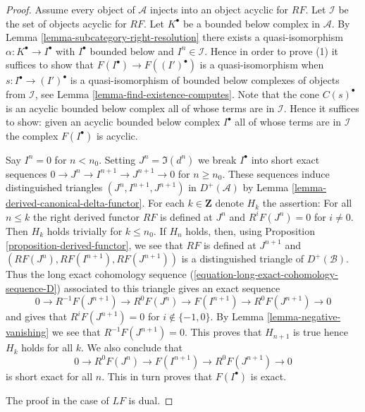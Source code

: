 \begin{proof}
Assume every object of $\mathcal{A}$ injects into an object acyclic
for $RF$. Let $\mathcal{I}$ be the set of objects acyclic for $RF$.
Let $K^\bullet$ be a bounded below complex in $\mathcal{A}$. By
Lemma \ref{lemma-subcategory-right-resolution}
there exists a quasi-isomorphism $\alpha : K^\bullet \to I^\bullet$ with
$I^\bullet$ bounded below and $I^n \in \mathcal{I}$. Hence in order to
prove (1) it suffices to show that
$F(I^\bullet) \to F((I')^\bullet)$ is a quasi-isomorphism when
$s : I^\bullet \to (I')^\bullet$ is a quasi-isomorphism of bounded
below complexes of objects from $\mathcal{I}$, see
Lemma \ref{lemma-find-existence-computes}.
Note that the cone $C(s)^\bullet$ is an acyclic bounded below complex
all of whose terms are in $\mathcal{I}$.
Hence it suffices to show: given an acyclic bounded below complex
$I^\bullet$ all of whose terms are in $\mathcal{I}$ the complex
$F(I^\bullet)$ is acyclic.

\medskip\noindent
Say $I^n = 0$ for $n < n_0$. Setting $J^n = \Im(d^n)$ we break
$I^\bullet$ into short exact sequences
$0 \to J^n \to I^{n + 1} \to J^{n + 1} \to 0$
for $n \geq n_0$. These sequences induce distinguished triangles
$(J^n, I^{n + 1}, J^{n + 1})$ in $D^+(\mathcal{A})$ by
Lemma \ref{lemma-derived-canonical-delta-functor}.
For each $k \in \mathbf{Z}$ denote $H_k$ the assertion:
For all $n \leq k$ the right derived functor
$RF$ is defined at $J^n$ and $R^iF(J^n) = 0$ for $i \not = 0$.
Then $H_k$ holds trivially for $k \leq n_0$. If $H_n$ holds,
then, using Proposition \ref{proposition-derived-functor},
we see that $RF$ is defined at $J^{n + 1}$ and
$(RF(J^n), RF(I^{n + 1}), RF(J^{n + 1}))$ is a distinguished
triangle of $D^+(\mathcal{B})$. Thus the long exact cohomology sequence
(\ref{equation-long-exact-cohomology-sequence-D})
associated to this triangle gives an exact sequence
$$
0 \to R^{-1}F(J^{n + 1}) \to R^0F(J^n) \to
F(I^{n + 1}) \to R^0F(J^{n + 1}) \to 0
$$
and gives that $R^iF(J^{n + 1}) = 0$ for $i \not \in \{-1, 0\}$.
By Lemma \ref{lemma-negative-vanishing} we see that $R^{-1}F(J^{n + 1}) = 0$.
This proves that $H_{n + 1}$ is true hence $H_k$ holds for all $k$.
We also conclude that
$$
0 \to R^0F(J^n) \to F(I^{n + 1}) \to R^0F(J^{n + 1}) \to 0
$$
is short exact for all $n$. This in turn proves that $F(I^\bullet)$ is exact.

\medskip\noindent
The proof in the case of $LF$ is dual.
\end{proof}

